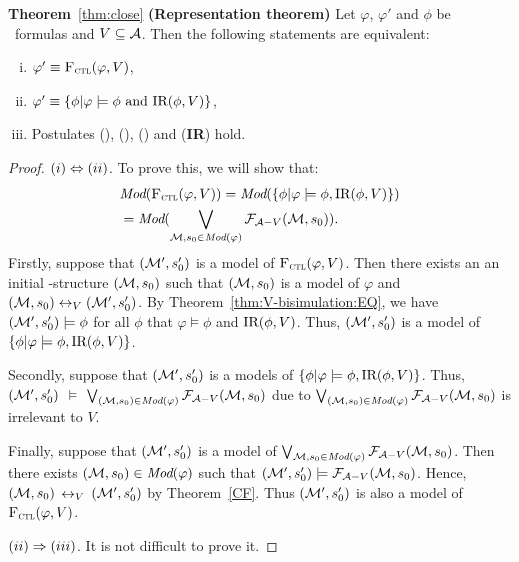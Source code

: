 \documentclass[letterpaper]{article} %
\begin{document}
\textbf{Theorem}~\ref{thm:close}
\textbf{(Representation theorem)}
Let $\varphi$, $\varphi'$ and $\phi$ be \CTL\ formulas and $V \subseteq {\cal A}$.
Then the following statements are equivalent:
\begin{enumerate}[(i)]
  \item $\varphi' \equiv {\textsc{F}_{\textsc{ctl}}}(\varphi, V)$,
  \item $\varphi'\equiv \{\phi | \varphi \models \phi \text{ and } \textrm{IR}(\phi, V)\}$,
  \item Postulates (\W), (\PP), (\NgP) and (\textbf{IR}) hold.
\end{enumerate}
\begin{proof}
$(i) \Leftrightarrow (ii)$. To prove this, we will show that:
\begin{align*}
 & \textit{Mod}({\textsc{F}_{\textsc{ctl}}}(\varphi, V)) = \textit{Mod}(\{\phi | \varphi \models \phi, \textrm{IR}(\phi, V)\})\\
 & = \textit{Mod}(\bigvee_{{\cal M}, s_0\in \textit{Mod}(\varphi)} {\cal F}_{{\cal A}- V}({\cal M}, s_0)).
\end{align*}
Firstly, suppose that $({\cal M}', s_0')$ is a model of ${\textsc{F}_{\textsc{ctl}}}(\varphi, V)$. Then there exists an  an initial \MPK-structure $({\cal M}, s_0)$ such that $({\cal M}, s_0)$ is a model of $\varphi$ and $({\cal M}, s_0) \leftrightarrow_V ({\cal M}', s_0')$. By Theorem~\ref{thm:V-bisimulation:EQ}, we have $({\cal M}', s_0') \models \phi$ for all $\phi$ that $\varphi\models \phi$ and $\textrm{IR}(\phi, V)$. Thus, $({\cal M}', s_0')$ is a model of $\{\phi | \varphi \models \phi, \textrm{IR}(\phi, V)\}$.

Secondly, suppose that $({\cal M}', s_0')$ is a models of $\{\phi | \varphi \models \phi, \textrm{IR}(\phi, V)\}$. Thus, $({\cal M}', s_0')$ $\models$ $\bigvee_{({\cal M}, s_0)\in \textit{Mod}(\varphi)} {\cal F}_{{\cal A}- V}({\cal M}, s_0)$ due to $\bigvee_{({\cal M}, s_0)\in \textit{Mod}(\varphi)} {\cal F}_{{\cal A}- V}({\cal M}, s_0)$ is irrelevant to $V$.

Finally, suppose that $({\cal M}', s_0')$ is a model of $\bigvee_{{\cal M}, s_0\in \textit{Mod}(\varphi)} {\cal F}_{{\cal A}- V}({\cal M}, s_0)$. Then there exists $({\cal M}, s_0) \in \textit{Mod}(\varphi)$ such that $({\cal M}', s_0') \models {\cal F}_{{\cal A}- V}({\cal M}, s_0)$. Hence, $({\cal M}, s_0)$ $\leftrightarrow_V$ $({\cal M}', s_0')$ by Theorem~\ref{CF}. Thus $({\cal M}', s_0')$ is also a model of ${\textsc{F}_{\textsc{ctl}}}(\varphi,V)$.


$(ii)\Rightarrow (iii)$. It is not difficult to prove it.


\end{proof}
\end{document}
